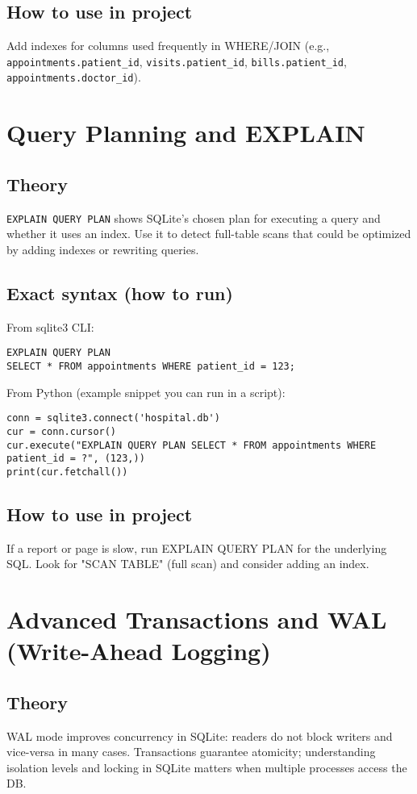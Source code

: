 \documentclass[11pt,a4paper]{article}
\begin{document}
\subsection{How to use in project}
Add indexes for columns used frequently in WHERE/JOIN (e.g., \texttt{appointments.patient_id}, \texttt{visits.patient_id}, \texttt{bills.patient_id}, \texttt{appointments.doctor_id}).

\section{Query Planning and EXPLAIN}
\subsection{Theory}
\texttt{EXPLAIN QUERY PLAN} shows SQLite's chosen plan for executing a query and whether it uses an index. Use it to detect full-table scans that could be optimized by adding indexes or rewriting queries.

\subsection{Exact syntax (how to run)}
From sqlite3 CLI:
\begin{lstlisting}
EXPLAIN QUERY PLAN
SELECT * FROM appointments WHERE patient_id = 123;
\end{lstlisting}
From Python (example snippet you can run in a script):
\begin{lstlisting}
conn = sqlite3.connect('hospital.db')
cur = conn.cursor()
cur.execute("EXPLAIN QUERY PLAN SELECT * FROM appointments WHERE patient_id = ?", (123,))
print(cur.fetchall())
\end{lstlisting}

\subsection{How to use in project}
If a report or page is slow, run EXPLAIN QUERY PLAN for the underlying SQL. Look for "SCAN TABLE" (full scan) and consider adding an index.

\section{Advanced Transactions and WAL (Write-Ahead Logging)}
\subsection{Theory}
WAL mode improves concurrency in SQLite: readers do not block writers and vice-versa in many cases. Transactions guarantee atomicity; understanding isolation levels and locking in SQLite matters when multiple processes access the DB.
\end{document}
